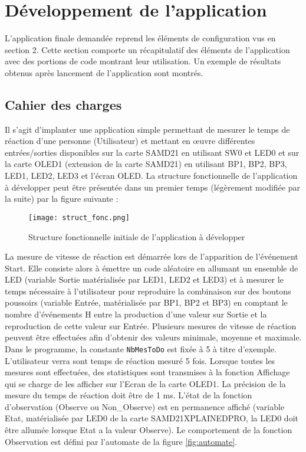 \section{Développement de l'application}

\indent L'application finale demandée reprend les éléments de configuration vus en section 2.
Cette section comporte un récapitulatif des éléments de l'application avec des portions de code montrant leur utilisation.
Un exemple de résultats obtenus après lancement de l'application sont montrés.

\subsection{Cahier des charges}

\indent Il s'agit d'implanter une application simple permettant de mesurer le temps de réaction d'une personne (Utilisateur) et mettant en œuvre différentes entrées/sorties disponibles sur la carte SAMD21 en utilisant SW0 et LED0 et sur la carte OLED1 (extension de la carte SAMD21) en utilisant BP1, BP2, BP3, LED1, LED2, LED3 et l'écran OLED.
La structure fonctionnelle de l'application à développer peut être présentée dans un premier temps (légèrement modifiée par la suite) par la figure suivante :

\begin{figure}[h]
    \centering
    \texttt{[image: struct\_fonc.png]}
    \caption{Structure fonctionnelle initiale de l'application à développer}
    \label{fig:struct}
\end{figure}
 La mesure de vitesse de réaction est démarrée lors de l'apparition de l'événement Start.
Elle consiste alors à émettre un code aléatoire en allumant un ensemble de LED (variable Sortie matérialisée par LED1, LED2 et LED3) et à mesurer le temps nécessaire à l'utilisateur pour reproduire la combinaison sur des boutons poussoirs (variable Entrée, matérialisée par BP1, BP2 et BP3) en comptant le nombre d'événements H entre la production d'une valeur sur Sortie et la reproduction de cette valeur sur Entrée. 
Plusieurs mesures de vitesse de réaction peuvent être effectuées afin d'obtenir des valeurs minimale, moyenne et maximale.
Dans le programme, la constante \texttt{NbMesToDo} est fixée à 5 à titre d'exemple.
L'utilisateur verra sont temps de réaction mesuré 5 fois.
Lorsque toutes les mesures sont effectuées, des statistiques sont transmises à la fonction Affichage qui se charge de les afficher sur l'Ecran de la carte OLED1.
La précision de la mesure du temps de réaction doit être de 1 ms.
L'état de la fonction d'observation (Observe ou Non\_Observe) est en permanence affiché (variable Etat, matérialisée par LED0 de la carte SAMD21XPLAINEDPRO, la LED0 doit être allumée lorsque Etat a la valeur Observe).
Le comportement de la fonction Observation est défini par l'automate de la figure \ref{fig:automate}.


